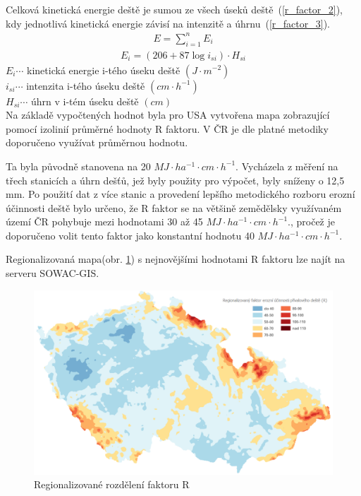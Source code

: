 Celková kinetická energie deště je sumou ze všech úseků
deště~(\ref{r_factor_2}), kdy jednotlivá kinetická energie závisí na
intenzitě a úhrnu~(\ref{r_factor_3}).\cite{usle1978}
\begin{align}
   \label{r_factor_2} E=\sum_{i=1}^n E_{i}
\end{align}
\begin{align}
   \label{r_factor_3} E_{i}=\left( 206+87 \log i_{si} \right) \cdot H_{si}
\end{align}
\hspace*{2cm}$E_{i} \cdots$ kinetická energie i-tého úseku deště
$\left( J\cdot m^{-2} \right)$\\
\hspace*{2cm}$i_{si} \cdots$ intenzita i-tého úseku deště $\left(
cm\cdot h^{-1} \right)$\\
\hspace*{2cm}$H_{si} \cdots$ úhrn v i-tém úseku deště $\left( cm
\right)$\\

Na základě vypočtených hodnot byla pro USA vytvořena mapa zobrazující
pomocí izolinií průměrné hodnoty R faktoru. \cite{usle1978} V ČR je
dle platné metodiky doporučeno využívat průměrnou
hodnotu.\cite{janecek2012}

Ta byla původně stanovena na 20 $MJ\cdot ha^{-1}\cdot cm \cdot
h^{-1}$. Vycházela z měření na třech stanicích a úhrn dešťů, jež
byly použity pro výpočet, byly sníženy o 12,5 mm. Po použití dat z více
stanic a provedení lepšího metodického rozboru erozní účinnosti deště
bylo určeno, že R faktor se na většině zemědělsky využívaném území ČR
pohybuje mezi hodnotami 30 až 45 $MJ\cdot ha^{-1}\cdot cm \cdot
h^{-1}$., pročež je doporučeno volit tento faktor jako konstantní
hodnotu 40 $MJ\cdot ha^{-1}\cdot cm \cdot h^{-1}$.\cite{janecek2012}

Regionalizovaná mapa(obr. \ref{fig:r_faktor}) s nejnovějšími hodnotami
R faktoru lze najít na serveru SOWAC-GIS.\cite{sowac}

\begin{figure}[H]
    \centering \includegraphics[scale=0.5]{./pictures/r_factor.png}
      \caption{Regionalizované rozdělení faktoru R}
      \label{fig:r_faktor}
\end{figure}

